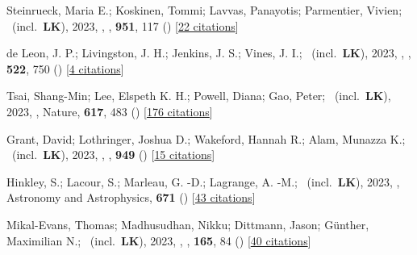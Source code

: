 \item[{\color{numcolor}\scriptsize90}] Steinrueck, Maria E.; Koskinen, Tommi; Lavvas, Panayotis; Parmentier, Vivien; \etal\ (incl.\ \textbf{LK}), 2023, , \apj, \textbf{951}, 117 () [\href{https://ui.adsabs.harvard.edu/abs/2023ApJ...951..117S}{22 citations}]

\item[{\color{numcolor}\scriptsize89}] de Leon, J. P.; Livingston, J. H.; Jenkins, J. S.; Vines, J. I.; \etal\ (incl.\ \textbf{LK}), 2023, , \mnras, \textbf{522}, 750 () [\href{https://ui.adsabs.harvard.edu/abs/2023MNRAS.522..750D}{4 citations}]

\item[{\color{numcolor}\scriptsize88}] Tsai, Shang-Min; Lee, Elspeth K. H.; Powell, Diana; Gao, Peter; \etal\ (incl.\ \textbf{LK}), 2023, , Nature, \textbf{617}, 483 () [\href{https://ui.adsabs.harvard.edu/abs/2023Natur.617..483T}{176 citations}]

\item[{\color{numcolor}\scriptsize87}] Grant, David; Lothringer, Joshua D.; Wakeford, Hannah R.; Alam, Munazza K.; \etal\ (incl.\ \textbf{LK}), 2023, , \apj, \textbf{949} () [\href{https://ui.adsabs.harvard.edu/abs/2023ApJ...949L..15G}{15 citations}]

\item[{\color{numcolor}\scriptsize86}] Hinkley, S.; Lacour, S.; Marleau, G. -D.; Lagrange, A. -M.; \etal\ (incl.\ \textbf{LK}), 2023, , Astronomy and Astrophysics, \textbf{671} () [\href{https://ui.adsabs.harvard.edu/abs/2023A&A...671L...5H}{43 citations}]

\item[{\color{numcolor}\scriptsize85}] Mikal-Evans, Thomas; Madhusudhan, Nikku; Dittmann, Jason; G{\"u}nther, Maximilian N.; \etal\ (incl.\ \textbf{LK}), 2023, , \aj, \textbf{165}, 84 () [\href{https://ui.adsabs.harvard.edu/abs/2023AJ....165...84M}{40 citations}]

